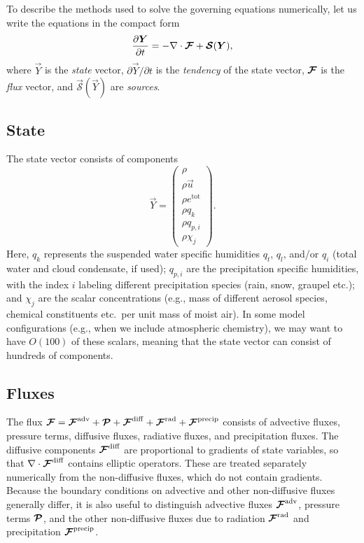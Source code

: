 \documentclass{report}
\begin{document}
{To describe the methods used to solve the governing equations numerically, let us write the equations in the compact form 
\begin{equation}\label{e:eom_compact}
\frac{\partial \boldsymbol{{Y}}}{\partial t}  =  - \nabla \cdot \boldsymbol{{\mathcal{F}}} + \boldsymbol{{\mathcal{S}}}(\boldsymbol{{Y}}),
\end{equation}
where $\vec{Y}$ is the \emph{state} vector, $\partial\vec{Y}/\partial t$ is the \emph{tendency} of the state vector, $\boldsymbol{{\mathcal{F}}}$ is the \emph{flux} vector, and $\vec{\mathcal{S}}(\vec{Y})$ are \emph{sources}. 

\subsection{State}

The state vector consists of components
\begin{equation}\label{e:state}
\vec{Y}=\left( \begin{array}{c}
\rho \\
\rho\vec{u} \\
\rho e^{\mathrm{tot}}\\
\rho q_k\\
\rho q_{p,i}\\
\rho \chi_j
\end{array}
\right).
\end{equation}
Here, $q_k$ represents the suspended water specific humidities $q_t$, $q_l$, and/or $q_i$ (total water and cloud condensate, if used); $q_{p,i}$ are the precipitation specific humidities, with the index $i$ labeling different precipitation species (rain, snow, graupel etc.); and $\chi_j$ are the scalar concentrations (e.g., mass of different aerosol species, chemical constituents etc.\ per unit mass of moist air). In some model configurations (e.g., when we include atmospheric chemistry), we may want to have $O(100)$ of these scalars, meaning that the state vector can consist of hundreds of components.

\subsection{Fluxes}

The flux $\boldsymbol{{\mathcal{F}}}=\boldsymbol{{\mathcal{F}}}^{\mathrm{adv}} + \boldsymbol{{\mathcal{P}}} +  \boldsymbol{{\mathcal{F}}}^{\mathrm{diff}} + \boldsymbol{{\mathcal{F}}}^{\mathrm{rad}} + \boldsymbol{{\mathcal{F}}}^{\mathrm{precip}}$ consists of advective fluxes, pressure terms, diffusive fluxes, radiative fluxes, and precipitation fluxes. The diffusive components $\boldsymbol{{\mathcal{F}}}^{\mathrm{diff}}$ are proportional to gradients of state variables, so that $\nabla \cdot \boldsymbol{{\mathcal{F}}}^{\mathrm{diff}}$ contains elliptic operators. These are treated separately numerically from the non-diffusive fluxes, which do not contain gradients. Because the boundary conditions on advective and other non-diffusive fluxes generally differ, it is also useful to distinguish advective fluxes $\boldsymbol{{\mathcal{F}}}^{\mathrm{adv}}$, pressure terms $\boldsymbol{{\mathcal{P}}}$, and the other non-diffusive fluxes due to radiation $\boldsymbol{{\mathcal{F}}}^{\mathrm{rad}}$ and precipitation $\boldsymbol{{\mathcal{F}}}^{\mathrm{precip}}$. 

}
\end{document}
